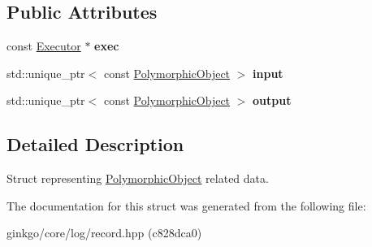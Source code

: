\subsection*{Public Attributes}
\begin{DoxyCompactItemize}
\item 
\mbox{\label{structgko_1_1log_1_1polymorphic__object__data_a673a2c661ae7c582475d044cf37a8ec2}} 
const \hyperlink{classgko_1_1Executor}{Executor} $\ast$ {\bfseries exec}
\item 
\mbox{\label{structgko_1_1log_1_1polymorphic__object__data_a835d796a090caae61492e27e657e09d8}} 
std\+::unique\+\_\+ptr$<$ const \hyperlink{classgko_1_1PolymorphicObject}{Polymorphic\+Object} $>$ {\bfseries input}
\item 
\mbox{\label{structgko_1_1log_1_1polymorphic__object__data_a47d7c908e465c205de05fc7e4aac7613}} 
std\+::unique\+\_\+ptr$<$ const \hyperlink{classgko_1_1PolymorphicObject}{Polymorphic\+Object} $>$ {\bfseries output}
\end{DoxyCompactItemize}


\subsection{Detailed Description}
Struct representing \hyperlink{classgko_1_1PolymorphicObject}{Polymorphic\+Object} related data. 

The documentation for this struct was generated from the following file\+:\begin{DoxyCompactItemize}
\item 
ginkgo/core/log/record.\+hpp (c828dca0)\end{DoxyCompactItemize}
